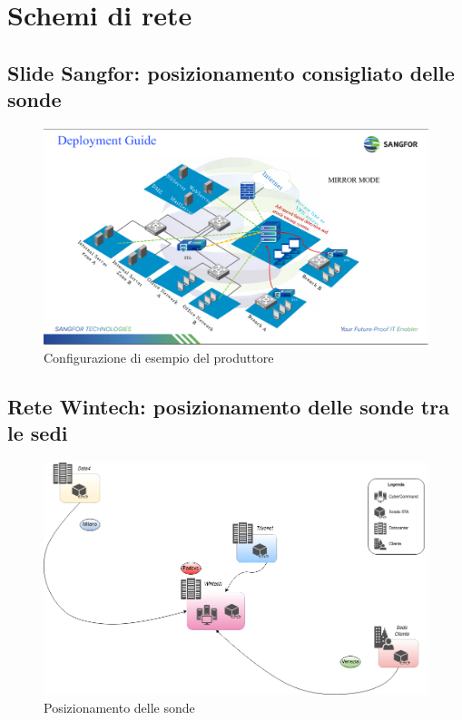 \chapter{Schemi di rete}
\label{appendix:schemi}

\section{Slide Sangfor: posizionamento consigliato delle sonde}
\label{network:sangfor-sta-position}

\begin{figure}[!htbp]
    \centering
    \includegraphics[width=0.8\linewidth]{images/ndr/sangfor-posizionamento.png}
    \caption{Configurazione di esempio del produttore}
    \label{fig:sangfor-sta-position}
\end{figure}

\pagebreak

\section{Rete Wintech: posizionamento delle sonde tra le sedi}
\label{network:wtc-sta-position}

\begin{figure}[!htbp]
    \centering
    \includegraphics[width=\textwidth]{images/ndr/sonde.png}
    \caption{Posizionamento delle sonde}
    \label{fig:wtc-sta-position}
\end{figure}

